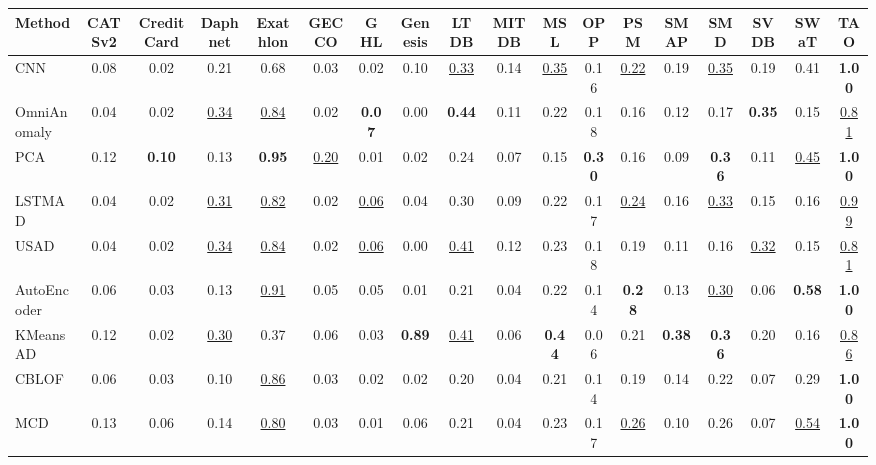 \documentclass[border=2pt]{standalone}
\begin{document}
\renewcommand{\arraystretch}{1.05}
\setlength{\tabcolsep}{2.5pt}
\small

\begin{tabular}{l|ccccccccccccccccc}
\toprule
\textbf{Method} & \textbf{CATSv2} & \textbf{CreditCard} & \textbf{Daphnet} & \textbf{Exathlon} & \textbf{GECCO} & \textbf{GHL} & \textbf{Genesis} & \textbf{LTDB} & \textbf{MITDB} & \textbf{MSL} & \textbf{OPP} & \textbf{PSM} & \textbf{SMAP} & \textbf{SMD} & \textbf{SVDB} & \textbf{SWaT} & \textbf{TAO} \\
\midrule
CNN                    & 0.08 & 0.02 & 0.21 & 0.68 & 0.03 & 0.02 & 0.10 & \underline{0.33} & 0.14 & \underline{0.35} & 0.16 & \underline{0.22} & 0.19 & \underline{0.35} & 0.19 & 0.41 & \textbf{1.00} \\
OmniAnomaly            & 0.04 & 0.02 & \underline{0.34} & \underline{0.84} & 0.02 & \textbf{0.07} & 0.00 & \textbf{0.44} & 0.11 & 0.22 & 0.18 & 0.16 & 0.12 & 0.17 & \textbf{0.35} & 0.15 & \underline{0.81} \\
PCA                    & 0.12 & \textbf{0.10} & 0.13 & \textbf{0.95} & \underline{0.20} & 0.01 & 0.02 & 0.24 & 0.07 & 0.15 & \textbf{0.30} & 0.16 & 0.09 & \textbf{0.36} & 0.11 & \underline{0.45} & \textbf{1.00} \\
LSTMAD                 & 0.04 & 0.02 & \underline{0.31} & \underline{0.82} & 0.02 & \underline{0.06} & 0.04 & 0.30 & 0.09 & 0.22 & 0.17 & \underline{0.24} & 0.16 & \underline{0.33} & 0.15 & 0.16 & \underline{0.99} \\
USAD                   & 0.04 & 0.02 & \underline{0.34} & \underline{0.84} & 0.02 & \underline{0.06} & 0.00 & \underline{0.41} & 0.12 & 0.23 & 0.18 & 0.19 & 0.11 & 0.16 & \underline{0.32} & 0.15 & \underline{0.81} \\
AutoEncoder            & 0.06 & 0.03 & 0.13 & \underline{0.91} & 0.05 & 0.05 & 0.01 & 0.21 & 0.04 & 0.22 & 0.14 & \textbf{0.28} & 0.13 & \underline{0.30} & 0.06 & \textbf{0.58} & \textbf{1.00} \\
KMeansAD               & 0.12 & 0.02 & \underline{0.30} & 0.37 & 0.06 & 0.03 & \textbf{0.89} & \underline{0.41} & 0.06 & \textbf{0.44} & 0.06 & 0.21 & \textbf{0.38} & \textbf{0.36} & 0.20 & 0.16 & \underline{0.86} \\
CBLOF                  & 0.06 & 0.03 & 0.10 & \underline{0.86} & 0.03 & 0.02 & 0.02 & 0.20 & 0.04 & 0.21 & 0.14 & 0.19 & 0.14 & 0.22 & 0.07 & 0.29 & \textbf{1.00} \\
MCD                    & 0.13 & 0.06 & 0.14 & \underline{0.80} & 0.03 & 0.01 & 0.06 & 0.21 & 0.04 & 0.23 & 0.17 & \underline{0.26} & 0.10 & 0.26 & 0.07 & \underline{0.54} & \textbf{1.00} \\

\end{tabular}
\end{document}
